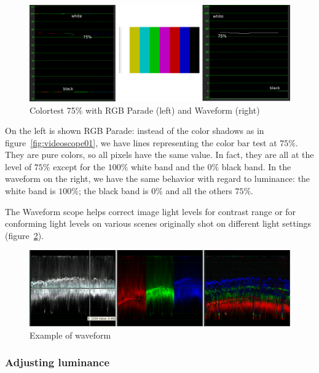 {\begin{figure}[hbtp]
    \centering
    \includegraphics[width=0.9\linewidth]{images/videoscope02.png}
    \caption{Colortest 75\% with RGB Parade (left) and Waveform (right)}
    \label{fig:videoscope02}
\end{figure}

On the left is shown RGB Parade: instead of the color shadows as in figure~\ref{fig:videoscope01}, we have lines representing the color bar test at $75\%$. They are pure colors, so all pixels have the same value. In fact, they are all at the level of $75\%$ except for the $100\%$ white band and the $0\%$ black band. In the waveform on the right, we have the same behavior with regard to luminance: the white band is $100\%$; the black band is $0\%$ and all the others $75\%$.

The Waveform scope helps correct image light levels for contrast range or for conforming light levels on various scenes originally shot on different light settings (figure~\ref{fig:videoscope03}).

\begin{figure}[hbtp]
    \centering
    \includegraphics[width=0.7\linewidth]{images/videoscope03.png}
    \caption{Example of waveform}
    \label{fig:videoscope03}
\end{figure}

\subsubsection*{Adjusting luminance}%
\label{ssub:adjusting_luminance}

}
